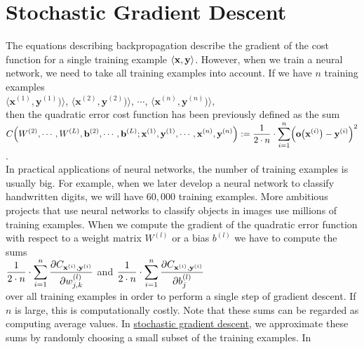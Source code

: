 \section{Stochastic Gradient Descent}
The equations describing backpropagation describe the gradient of the cost function for a single training
example $\pair(\mathbf{x}, \mathbf{y})$.  However, when we train a neural network, we need to take all training
examples into account.  If we have $n$ training examples
\\[0.2cm]
\hspace*{1.3cm}
$\langle\mathbf{x}^{(1)}, \mathbf{y}^{(1)})\rangle$,
$\langle\mathbf{x}^{(2)}, \mathbf{y}^{(2)})\rangle$,
$\cdots$,
$\langle\mathbf{x}^{(n)}, \mathbf{y}^{(n)})\rangle$,
\\[0.2cm]
then the quadratic error cost function has been previously defined as the sum
\\[0.2cm]
\hspace*{1.3cm}
$\displaystyle C\Bigr(W^{(2)}, \cdots, W^{(L)}, \mathbf{b}^{(2)}, \cdots, \mathbf{b}^{(L)};
     \mathbf{x}^{(1)}, \mathbf{y}^{(1)}, \cdots, \mathbf{x}^{(n)},\mathbf{y}^{(n)} \Bigr) := 
 \frac{1}{2 \cdot n} \cdot \sum\limits_{i=1}^n \Bigl(\mathbf{o}\bigl(\mathbf{x}^{(i)}\bigr) - \mathbf{y}^{(i)}\Bigr)^2
$.
\\[0.2cm]
In practical applications of neural networks, the number of training examples is usually big.  For example, 
when we later develop a neural network to classify handwritten digits, we will have $60,000$ training examples.  More
ambitious projects that use neural networks to classify objects in images use millions of training examples.
When we compute the gradient of the quadratic error function with respect to a weight matrix $W^{(l)}$ or a bias $b^{(l)}$ we
have to compute the sums 
\\[0.2cm]
\hspace*{1.3cm}
$\displaystyle \frac{1}{2\cdot n} \cdot \sum\limits_{i=1}^n \frac{\partial C_{\mathbf{x}^{(i)}, \mathbf{y}^{(i)}}}{\partial w_{j,k}^{(l)}}$
\quad and \quad
$\displaystyle \frac{1}{2\cdot n} \cdot \sum\limits_{i=1}^n \frac{\partial C_{\mathbf{x}^{(i)}, \mathbf{y}^{(i)}}}{\partial b_{j}^{(l)}}$
\\[0.2cm]
over all training examples in order to perform a single step of gradient descent.  If $n$ is large, this is
computationally costly.  Note that these sums can be regarded as computing average values.  In 
\href{https://en.wikipedia.org/wiki/Stochastic_gradient_descent}{stochastic gradient descent}, 
we approximate these sums by randomly choosing a small subset of the training examples.  In
